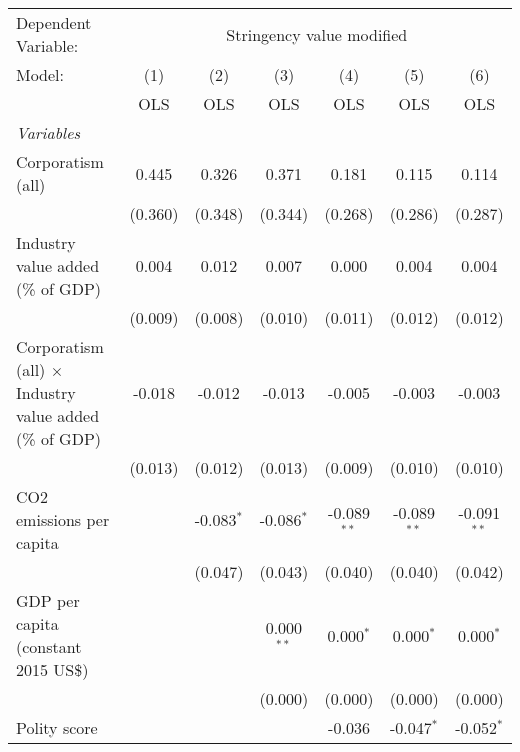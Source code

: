 
\begingroup
\centering
\begin{tabular}{lcccccc}
   \toprule
   Dependent Variable: & \multicolumn{6}{c}{Stringency value modified}\\
   Model:                                                        & (1)     & (2)          & (3)          & (4)           & (5)           & (6)\\  
                                                                 &  OLS    & OLS          & OLS          & OLS           & OLS           & OLS\\  
   \midrule
   \emph{Variables}\\
   Corporatism (all)                                             & 0.445   & 0.326        & 0.371        & 0.181         & 0.115         & 0.114\\   
                                                                 & (0.360) & (0.348)      & (0.344)      & (0.268)       & (0.286)       & (0.287)\\   
   Industry value added (\% of GDP)                              & 0.004   & 0.012        & 0.007        & 0.000         & 0.004         & 0.004\\   
                                                                 & (0.009) & (0.008)      & (0.010)      & (0.011)       & (0.012)       & (0.012)\\   
   Corporatism (all) $\times$ Industry value added (\% of GDP)   & -0.018  & -0.012       & -0.013       & -0.005        & -0.003        & -0.003\\   
                                                                 & (0.013) & (0.012)      & (0.013)      & (0.009)       & (0.010)       & (0.010)\\   
   CO2 emissions per capita                                      &         & -0.083$^{*}$ & -0.086$^{*}$ & -0.089$^{**}$ & -0.089$^{**}$ & -0.091$^{**}$\\   
                                                                 &         & (0.047)      & (0.043)      & (0.040)       & (0.040)       & (0.042)\\   
   GDP per capita (constant 2015 US\$)                           &         &              & 0.000$^{**}$ & 0.000$^{*}$   & 0.000$^{*}$   & 0.000$^{*}$\\   
                                                                 &         &              & (0.000)      & (0.000)       & (0.000)       & (0.000)\\   
   Polity score                                                  &         &              &              & -0.036        & -0.047$^{*}$  & -0.052$^{*}$\\   

\end{tabular}
